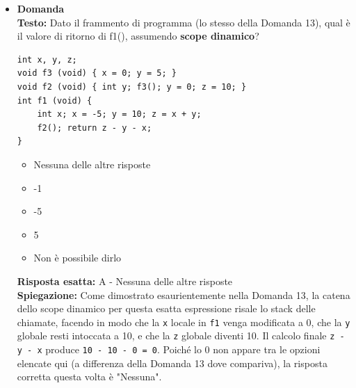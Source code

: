 \documentclass[12pt, a4paper]{article}
\newcounter{domandateoria}
\begin{document}
\begin{itemize}
    \item {}\textbf{Domanda \thedomandateoria} \\
    \textbf{Testo:} Dato il frammento di programma (lo stesso della Domanda 13), qual è il valore di ritorno di f1(), assumendo \textbf{scope dinamico}?
\begin{verbatim}
int x, y, z;
void f3 (void) { x = 0; y = 5; }
void f2 (void) { int y; f3(); y = 0; z = 10; }
int f1 (void) {
    int x; x = -5; y = 10; z = x + y;
    f2(); return z - y - x;
}
\end{verbatim}
    \begin{itemize}
        \item[A)] Nessuna delle altre risposte
        \item[B)] -1
        \item[C)] -5
        \item[D)] 5
        \item[E)] Non è possibile dirlo
    \end{itemize}
    \textbf{Risposta esatta:} A - Nessuna delle altre risposte \\
    \textbf{Spiegazione:} Come dimostrato esaurientemente nella Domanda 13, la catena dello scope dinamico per questa esatta espressione risale lo stack delle chiamate, facendo in modo che la \texttt{x} locale in \texttt{f1} venga modificata a 0, che la \texttt{y} globale resti intoccata a 10, e che la \texttt{z} globale diventi 10. Il calcolo finale \texttt{z - y - x} produce \texttt{10 - 10 - 0 = 0}. Poiché lo 0 non appare tra le opzioni elencate qui (a differenza della Domanda 13 dove compariva), la risposta corretta questa volta è "Nessuna".
    \vspace{0.3cm}

\newpage


\end{itemize}
\end{document}

